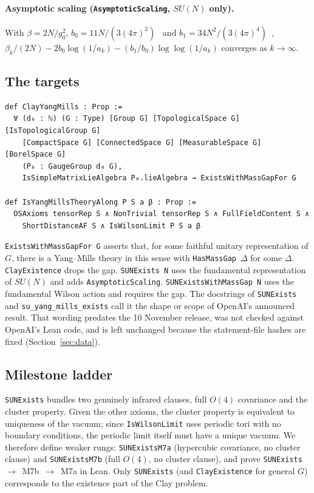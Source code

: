 \documentclass[11pt]{article}
\theoremstyle{definition}
\theoremstyle{remark}
\newcommand{\lean}[1]{\texttt{\hyphenchar\font=-1\relax #1}}
\begin{document}
\paragraph{Asymptotic scaling (\lean{AsymptoticScaling}, $SU(N)$ only).}
With $\beta=2N/g_0^2$, $b_0=11N/(3(4\pi)^2)$~\cite{Gross1973,Politzer1973} and
$b_1=34N^2/(3(4\pi)^4)$~\cite{Caswell1974,Jones1974},
$\beta_k/(2N)-2b_0\log(1/a_k)-(b_1/b_0)\log\log(1/a_k)$ converges as $k\to\infty$.

\subsection{The targets}
\begin{Verbatim}
def ClayYangMills : Prop :=
  ∀ (d₀ : ℕ) (G : Type) [Group G] [TopologicalSpace G] [IsTopologicalGroup G]
    [CompactSpace G] [ConnectedSpace G] [MeasurableSpace G] [BorelSpace G]
    (P₀ : GaugeGroup d₀ G),
    IsSimpleMatrixLieAlgebra P₀.lieAlgebra → ExistsWithMassGapFor G

def IsYangMillsTheoryAlong P S a β : Prop :=
  OSAxioms tensorRep S ∧ NonTrivial tensorRep S ∧ FullFieldContent S ∧
    ShortDistanceAF S ∧ IsWilsonLimit P S a β
\end{Verbatim}
\lean{ExistsWithMassGapFor G} asserts that, for some faithful unitary representation of $G$,
there is a Yang--Mills theory in this sense with \lean{HasMassGap}~$\Delta$ for some $\Delta$.
\lean{ClayExistence} drops the gap. \lean{SUNExists N} uses the fundamental representation of
$SU(N)$ and adds \lean{AsymptoticScaling}. \lean{SUNExistsWithMassGap N} uses the fundamental
Wilson action and requires the gap. The docstrings of \lean{SUNExists} and
\lean{su\_yang\_mills\_exists} call it the shape or scope of OpenAI's announced result. That wording
predates the 10 November release, was not checked against OpenAI's Lean code, and is left unchanged
because the statement-file hashes are fixed (Section~\ref{sec:data}).

\subsection{Milestone ladder}
\lean{SUNExists} bundles two genuinely infrared clauses, full $O(4)$ covariance and the cluster
property. Given the other axioms, the cluster property is equivalent to uniqueness of the vacuum;
since \lean{IsWilsonLimit} uses periodic tori with no boundary conditions, the periodic limit itself
must have a unique vacuum. We therefore define weaker rungs:
\lean{SUNExistsM7a} (hypercubic covariance, no cluster clause) and \lean{SUNExistsM7b} (full
$O(4)$, no cluster clause), and prove \lean{SUNExists}~$\to$~M7b~$\to$~M7a in Lean. Only
\lean{SUNExists} (and \lean{ClayExistence} for general $G$) corresponds to the existence part of
the Clay problem.
\end{document}
